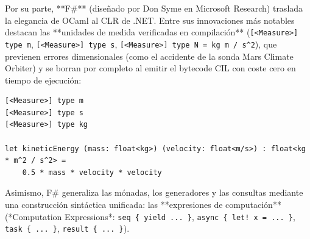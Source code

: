 \documentclass{book}
\begin{document}
Por su parte, **F\#** (diseñado por Don Syme en Microsoft Research) traslada la elegancia de OCaml al CLR de .NET. Entre sus innovaciones más notables destacan las **unidades de medida verificadas en compilación** (\texttt{[<Measure>] type m}, \texttt{[<Measure>] type s}, \texttt{[<Measure>] type N = kg m / s\textasciicircum{}2}), que previenen errores dimensionales (como el accidente de la sonda Mars Climate Orbiter) y se borran por completo al emitir el bytecode CIL con coste cero en tiempo de ejecución:
\begin{lstlisting}[style=studium]
[<Measure>] type m
[<Measure>] type s
[<Measure>] type kg

let kineticEnergy (mass: float<kg>) (velocity: float<m/s>) : float<kg * m^2 / s^2> =
    0.5 * mass * velocity * velocity
\end{lstlisting}
Asimismo, F\# generaliza las mónadas, los generadores y las consultas mediante una construcción sintáctica unificada: las **expresiones de computación** (*Computation Expressions*: \texttt{seq \{ yield ... \}}, \texttt{async \{ let! x = ... \}}, \texttt{task \{ ... \}}, \texttt{result \{ ... \}}).
\end{document}
